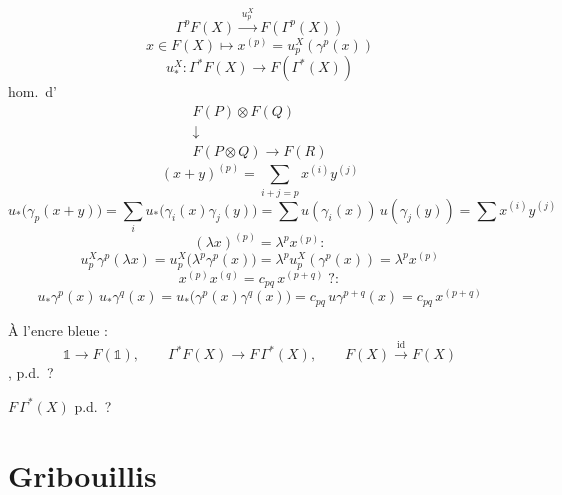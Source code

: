 \documentclass[11pt,a4paper]{article}
\begin{document}
\[
\Gamma^pF(X) \xrightarrow{\;u^X_p\;} F(\Gamma^p(X))
\]
\[
x\in F(X) \longmapsto x^{(p)} = u^X_p(\gamma^p(x))
\]
\[
u^X_* : \Gamma^*F(X) \longrightarrow F(\Gamma^*(X))
\]
hom.\ d'
\[
\begin{array}{c}
F(P)\otimes F(Q) \\
\downarrow \\
F(P\otimes Q) \to F(R)
\end{array}
\]
 \struck{\ill{}}  
\[
(x+y)^{(p)} = \sum_{i+j=p} x^{(i)}y^{(j)}
\]
\[
u_*\bigl(\gamma_p(x+y)\bigr) = \sum_i u_*\bigl(\gamma_i(x)\gamma_j(y)\bigr)
= \sum u(\gamma_i(x))\,u(\gamma_j(y)) = \sum x^{(i)}y^{(j)}
\]
\[
(\lambda x)^{(p)} = \lambda^px^{(p)} :
\]
\[
u^X_p\gamma^p(\lambda x) = u^X_p\bigl(\lambda^p\gamma^p(x)\bigr) = \lambda^pu^X_p(\gamma^p(x)) = \lambda^px^{(p)}
\]
\[
x^{(p)}x^{(q)} = c_{pq}\,x^{(p+q)}\;? :
\]
\[
u_*\gamma^p(x)\,u_*\gamma^q(x) = u_*\bigl(\gamma^p(x)\gamma^q(x)\bigr) = c_{pq}\,u\gamma^{p+q}(x) = c_{pq}\,x^{(p+q)}
\]

À l'encre bleue :
\[
\mathbb{1} \longrightarrow F(\mathbb{1}), \qquad
\Gamma^*F(X) \longrightarrow F\,\Gamma^*(X), \qquad
F(X) \xrightarrow{\;\mathrm{id}\;} F(X)
\]
, \ill{}  \ill{} p.d.~?

$F\,\Gamma^*(X)$   p.d.~?


\section{Gribouillis}
\end{document}
